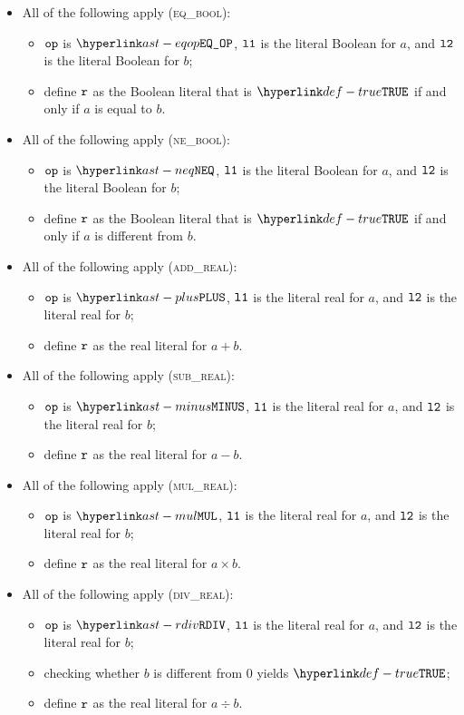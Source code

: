 \begin{itemize}
  \item All of the following apply (\textsc{eq\_bool}):
  \begin{itemize}
    \item $\texttt{op}$ is $\EQOP$, $\texttt{l1}$ is the literal Boolean for $a$, and $\texttt{l2}$ is the literal Boolean for $b$;
    \item define $\texttt{r}$ as the Boolean literal that is $\True$ if and only if $a$ is equal to $b$.
  \end{itemize}

  \item All of the following apply (\textsc{ne\_bool}):
  \begin{itemize}
    \item $\texttt{op}$ is $\NEQ$, $\texttt{l1}$ is the literal Boolean for $a$, and $\texttt{l2}$ is the literal Boolean for $b$;
    \item define $\texttt{r}$ as the Boolean literal that is $\True$ if and only if $a$ is different from $b$.
  \end{itemize}

  \item All of the following apply (\textsc{add\_real}):
  \begin{itemize}
    \item $\texttt{op}$ is $\PLUS$, $\texttt{l1}$ is the literal real for $a$, and $\texttt{l2}$ is the literal real for $b$;
    \item define $\texttt{r}$ as the real literal for $a + b$.
  \end{itemize}

  \item All of the following apply (\textsc{sub\_real}):
  \begin{itemize}
    \item $\texttt{op}$ is $\MINUS$, $\texttt{l1}$ is the literal real for $a$, and $\texttt{l2}$ is the literal real for $b$;
    \item define $\texttt{r}$ as the real literal for $a - b$.
  \end{itemize}

  \item All of the following apply (\textsc{mul\_real}):
  \begin{itemize}
    \item $\texttt{op}$ is $\MUL$, $\texttt{l1}$ is the literal real for $a$, and $\texttt{l2}$ is the literal real for $b$;
    \item define $\texttt{r}$ as the real literal for $a \times b$.
  \end{itemize}

  \item All of the following apply (\textsc{div\_real}):
  \begin{itemize}
    \item $\texttt{op}$ is $\RDIV$, $\texttt{l1}$ is the literal real for $a$, and $\texttt{l2}$ is the literal real for $b$;
    \item checking whether $b$ is different from $0$ yields $\True$\ProseOrTypeError;
    \item define $\texttt{r}$ as the real literal for $a \div b$.
  \end{itemize}


\end{itemize}
